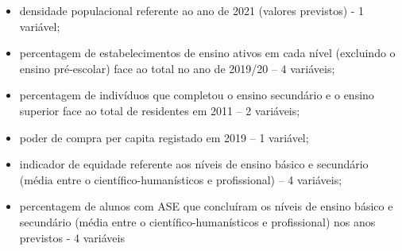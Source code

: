 \documentclass[
]{book}
\providecommand{\tightlist}{%
  \setlength{\itemsep}{0pt}\setlength{\parskip}{0pt}}
\begin{document}
\begin{itemize}
\tightlist
\item
  densidade populacional referente ao ano de 2021 (valores previstos) - 1 variável;
\item
  percentagem de estabelecimentos de ensino ativos em cada nível (excluindo o ensino pré-escolar) face ao total no ano de 2019/20 -- 4 variáveis;
\item
  percentagem de indivíduos que completou o ensino secundário e o ensino superior face ao total de residentes em 2011 -- 2 variáveis;
\item
  poder de compra per capita registado em 2019 -- 1 variável;
\item
  indicador de equidade referente aos níveis de ensino básico e secundário (média entre o científico-humanísticos e profissional) -- 4 variáveis;
\item
  percentagem de alunos com ASE que concluíram os níveis de ensino básico e secundário (média entre o científico-humanísticos e profissional) nos anos previstos - 4 variáveis
\end{itemize}
\end{document}
